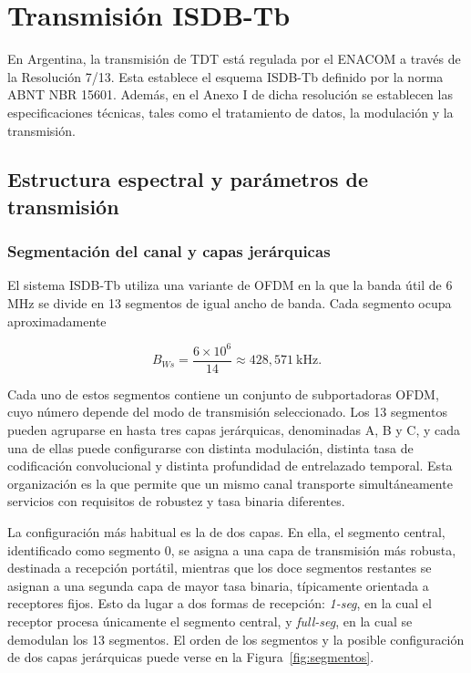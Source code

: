 \chapter{Transmisión ISDB-Tb}
\label{chap:isdbtb_tx}


En Argentina, la transmisión de TDT está regulada por el ENACOM a través de la Resolución 7/13. Esta establece el esquema ISDB-Tb definido por la norma ABNT NBR 15601. Además, en el Anexo I de dicha resolución se establecen las especificaciones técnicas, tales como el tratamiento de datos, la modulación y la transmisión.


\section{Estructura espectral y parámetros de transmisión}

\subsection{Segmentación del canal y capas jerárquicas}

El sistema ISDB-Tb utiliza una variante de OFDM en la que la banda útil de 6 MHz se divide en 13 segmentos de igual ancho de banda. Cada segmento ocupa aproximadamente

\begin{equation}
B_{Ws}=\frac{6\times 10^6}{14}\approx 428{,}571\ \mathrm{kHz}.
\end{equation}

Cada uno de estos segmentos contiene un conjunto de subportadoras OFDM, cuyo número depende del modo de transmisión seleccionado. Los 13 segmentos pueden agruparse en hasta tres capas jerárquicas, denominadas A, B y C, y cada una de ellas puede configurarse con distinta modulación, distinta tasa de codificación convolucional y distinta profundidad de entrelazado temporal. Esta organización es la que permite que un mismo canal transporte simultáneamente servicios con requisitos de robustez y tasa binaria diferentes.

La configuración más habitual es la de dos capas. En ella, el segmento central, identificado como segmento 0, se asigna a una capa de transmisión más robusta, destinada a recepción portátil, mientras que los doce segmentos restantes se asignan a una segunda capa de mayor tasa binaria, típicamente orientada a receptores fijos. Esto da lugar a dos formas de recepción: \textit{1-seg}, en la cual el receptor procesa únicamente el segmento central, y \textit{full-seg}, en la cual se demodulan los 13 segmentos. El orden de los segmentos y la posible configuración de dos capas jerárquicas puede verse en la Figura~\ref{fig:segmentos}.

